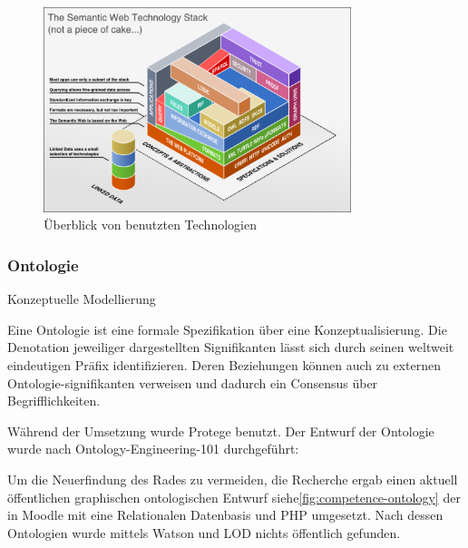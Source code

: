\documentclass[
12pt,
english,
ngerman,
headsepline,
twoside,
openright,
numbers=noenddot,version=first
]{scrreprt}
\begin{document}
\begin{figure}[h]
	\centering
	\includegraphics[width=0.8\textwidth]{pics/semantic_web_technology_stack.eps}
	\caption{Überblick von benutzten Technologien}
	\label{fig:semantic-web-stack}
\end{figure}

\subsubsection{Ontologie}{Konzeptuelle Modellierung}
\label{subsec:ontology}

Eine Ontologie ist eine formale Spezifikation über eine Konzeptualisierung\cite{ontoWhat}. Die Denotation jeweiliger dargestellten Signifikanten lässt sich durch seinen weltweit eindeutigen Präfix identifizieren. Deren Beziehungen können auch zu externen Ontologie-signifikanten verweisen und dadurch ein Consensus über Begrifflichkeiten. 

Während der Umsetzung wurde Protege\cite{Protégé} benutzt.
Der Entwurf der Ontologie wurde nach Ontology-Engineering-101 durchgeführt:


Um die Neuerfindung des Rades zu vermeiden, die Recherche ergab einen aktuell öffentlichen graphischen ontologischen Entwurf\cite{ontoMoodle} siehe\ref{fig:competence-ontology} der in Moodle mit eine Relationalen Datenbasis und PHP umgesetzt. Nach dessen Ontologien wurde mittels Watson\cite{Watson} und LOD\cite{LOD} nichts öffentlich gefunden. 
\end{document}
